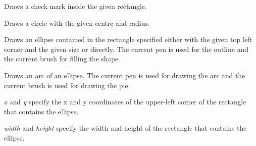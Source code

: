 \label{wxdcdrawcheckmark}



Draws a check mark inside the given rectangle.


\label{wxdcdrawcircle}



Draws a circle with the given centre and radius.




\label{wxdcdrawellipse}




Draws an ellipse contained in the rectangle specified either with the given top
left corner and the given size or directly. The current pen is used for the
outline and the current brush for filling the shape.




\label{wxdcdrawellipticarc}


Draws an arc of an ellipse. The current pen is used for drawing the arc and
the current brush is used for drawing the pie.

{\it x} and {\it y} specify the x and y coordinates of the upper-left corner of the rectangle that contains
the ellipse.

{\it width} and {\it height} specify the width and height of the rectangle that contains
the ellipse.

